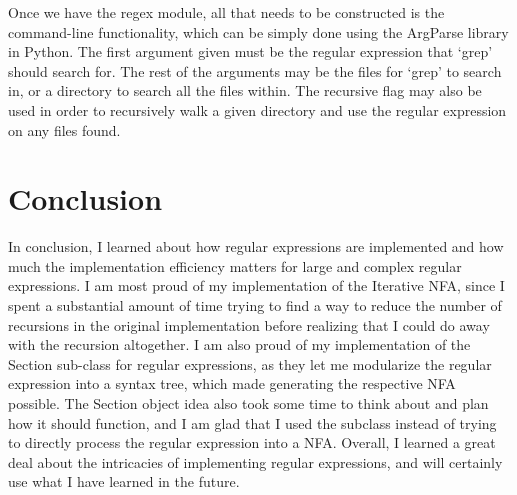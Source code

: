 \documentclass{article}
\begin{document}
\indent Once we have the regex module, all that needs to be constructed is the command-line functionality, which can be simply done using the ArgParse library in Python. The first argument given must be the regular expression that `grep' should search for. The rest of the arguments may be the files for `grep' to search in, or a directory to search all the files within. The recursive flag may also be used in order to recursively walk a given directory and use the regular expression on any files found.\\

\section*{Conclusion}
In conclusion, I learned about how regular expressions are implemented and how much the implementation efficiency matters for large and complex regular expressions. I am most proud of my implementation of the Iterative NFA, since I spent a substantial amount of time trying to find a way to reduce the number of recursions in the original implementation before realizing that I could do away with the recursion altogether. I am also proud of my implementation of the Section sub-class for regular expressions, as they let me modularize the regular expression into a syntax tree, which made generating the respective NFA possible. The Section object idea also took some time to think about and plan how it should function, and I am glad that I used the subclass instead of trying to directly process the regular expression into a NFA. Overall, I learned a great deal about the intricacies of implementing regular expressions, and will certainly use what I have learned in the future.\\
\end{document}
